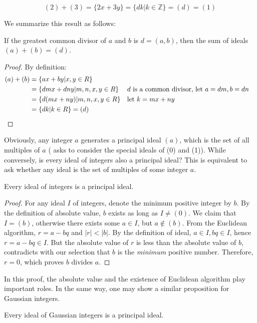 \documentclass[b5paper]{article}
\begin{document}
\[
(2) + (3) = \{2x + 3y\} = \{dk | k \in \mathbb{Z}\} = (d) = (1)
\]

We summarize this result as follows:
\begin{proposition}
If the greatest common divisor of $a$ and $b$ is $d = (a, b)$, then the sum of ideals$(a) + (b) = (d)$.
\end{proposition}

\begin{proof}
By definition:
\begin{align*}
(a) + (b) &= \{ax + by | x, y \in R\} \\
  &= \{dmx + dny | m, n, x, y \in R\} && d\text{ is a common divisor, let }a = dm, b = dn \\
  &= \{d(mx + ny) | m, n, x, y \in R\} && \text{let }k = mx + ny \\
  &= \{dk | k \in R \} = (d) && \qedhere
\end{align*}
\end{proof}

Obviously, any integer $a$ generates a principal ideal $(a)$, which is the set of all multiples of $a$ ( asks to consider the special ideals of (0) and (1)). While conversely, is every ideal of integers also a principal ideal? This is equivalent to ask whether any ideal is the set of multiples of some integer $a$.

\begin{proposition}
Every ideal of integers is a principal ideal.
\end{proposition}

\begin{proof}
For any ideal $I$ of integers, denote the minimum positive integer by $b$. By the definition of absolute value, $b$ exists as long as $I \ne (0)$. We claim that $I = (b)$, otherwise there exists some $a \in I$, but $a \notin (b)$. From the Euclidean algorithm, $r = a - bq$ and $|r| < |b|$. By the definition of ideal, $a \in I, bq \in I$, hence $r = a - bq \in I$. But the absolute value of $r$ is less than the absolute value of $b$, contradicts with our selection that $b$ is the \emph{minimum} positive number. Therefore, $r = 0$, which proves $b$ divides $a$.
\end{proof}

In this proof, the absolute value and the existence of Euclidean algorithm play important roles. In the same way, one may show a similar proposition for Gaussian integers.

\begin{proposition}
Every ideal of Gaussian integers is a principal ideal.
\end{proposition}
\end{document}
